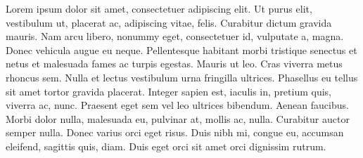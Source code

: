 \documentclass[a4paper,12pt]{article}
\begin{document}

\hspace{3cm}Lorem ipsum dolor sit amet, consectetuer adipiscing elit. Ut purus elit, vestibulum ut, placerat ac,  adipiscing vitae, felis. Curabitur dictum gravida mauris. Nam arcu libero, nonummy eget, consectetuer id, vulputate a, magna. Donec vehicula augue eu neque. Pellentesque habitant morbi tristique senectus et netus et malesuada fames ac turpis egestas. Mauris ut leo. Cras viverra metus rhoncus sem. Nulla et lectus vestibulum urna fringilla ultrices. \bigskip Phasellus eu tellus sit amet tortor gravida placerat. Integer sapien est, iaculis in, pretium quis, viverra ac, nunc. Praesent eget sem vel leo ultrices bibendum. Aenean faucibus. Morbi dolor nulla, malesuada eu, pulvinar at, mollis ac, nulla. Curabitur auctor semper nulla. Donec varius orci eget risus. Duis nibh mi, congue eu, accumsan eleifend, sagittis quis, diam. Duis eget orci sit amet orci dignissim rutrum.
\end{document}
